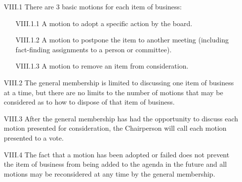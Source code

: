 \documentclass[12pt,a4paper]{article}
\begin{document}
\begin{enumerate}
\item[VIII.1] There are 3 basic motions for each item of business:

\begin{enumerate}
\item[VIII.1.1] A motion to adopt a specific action by the board.

\item[VIII.1.2] A motion to postpone the item to another meeting (including fact-finding assignments to a person or committee).

\item[VIII.1.3] A motion to remove an item from consideration.
\end{enumerate}

\item[VIII.2] The general membership is limited to discussing one item of business at a time, but there are no limits to the number of motions that may be considered as to how to dispose of that item of business.

\item[VIII.3] After the general membership has had the opportunity to discuss each motion presented for consideration, the Chairperson will call each motion presented to a vote.

\item[VIII.4] The fact that a motion has been adopted or failed does not prevent the item of business from being added to the agenda in the future and all motions may be reconsidered at any time by the general membership.
\end{enumerate}
\end{document}
